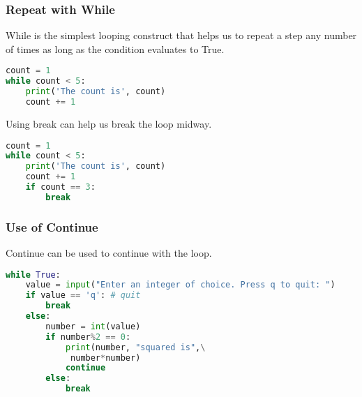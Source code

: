 \documentclass{beamer}
\begin{document}
\begin{frame}[fragile]
\frametitle{Repeat with While}
While is the simplest looping construct that helps us to repeat a step any number of times as long as the condition evaluates to True.
\begin{lstlisting}[language=Python]
count = 1
while count < 5:
    print('The count is', count)
    count += 1
\end{lstlisting}
Using break can help us break the loop midway.
\begin{lstlisting}[language=Python]
count = 1
while count < 5:
    print('The count is', count)
    count += 1
    if count == 3:
    	break
\end{lstlisting}
\end{frame}

\begin{frame}[fragile]
\frametitle{Use of Continue}
Continue can be used to continue with the loop.
\begin{lstlisting}[language=Python]
while True:
    value = input("Enter an integer of choice. Press q to quit: ")
    if value == 'q': # quit
        break
    else:
        number = int(value)
        if number%2 == 0:
            print(number, "squared is",\
             number*number)
            continue
        else:
            break
        
\end{lstlisting}
\end{frame}
\end{document}
